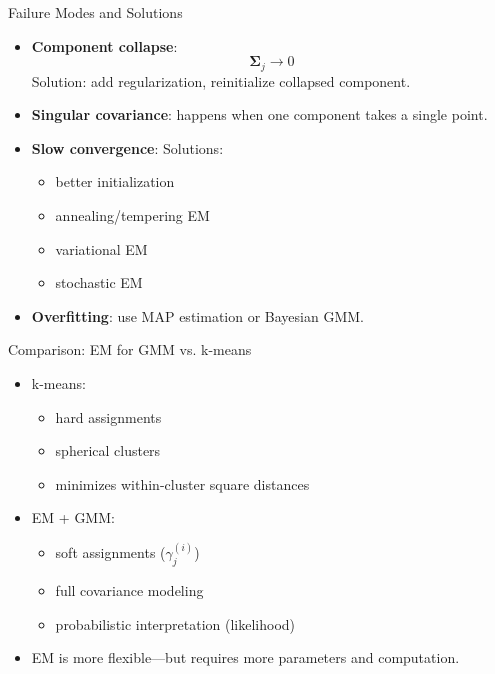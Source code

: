 \documentclass[serif, aspectratio=169]{beamer}
\begin{document}
\begin{frame}{Failure Modes and Solutions}
\begin{itemize}
    \item \textbf{Component collapse}:
    \[
    \mathbf{\Sigma}_j \to 0
    \]
    Solution: add regularization, reinitialize collapsed component.
    \item \textbf{Singular covariance}: happens when one component takes a single point.
    \item \textbf{Slow convergence}:  
    Solutions:
    \begin{itemize}
        \item better initialization
        \item annealing/tempering EM
        \item variational EM
        \item stochastic EM
    \end{itemize}
    \item \textbf{Overfitting}: use MAP estimation or Bayesian GMM.
\end{itemize}
\end{frame}

\begin{frame}{Comparison: EM for GMM vs. k-means}
\begin{itemize}
    \item k-means:
    \begin{itemize}
        \item hard assignments
        \item spherical clusters
        \item minimizes within-cluster square distances
    \end{itemize}
    \item EM + GMM:
    \begin{itemize}
        \item soft assignments ($\gamma_j^{(i)}$)
        \item full covariance modeling
        \item probabilistic interpretation (likelihood)
    \end{itemize}
    \item EM is more flexible—but requires more parameters and computation.
\end{itemize}
\end{frame}
\end{document}
